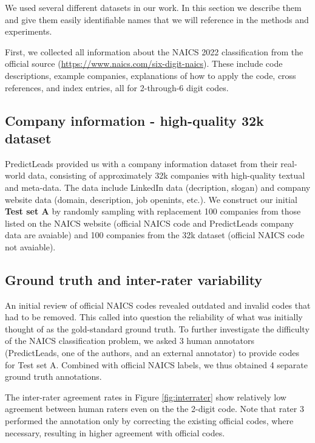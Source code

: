\documentclass[fleqn,moreauthors,10pt]{ds_report}
\begin{document}
We used several different datasets in our work. In this section we describe them and give them easily identifiable names that we will reference in the methods and experiments.

First, we collected all information about the NAICS 2022 classification from the official source (\url{https://www.naics.com/six-digit-naics}). These include code descriptions, example companies, explanations of how to apply the code, cross references, and index entries, all for 2-through-6 digit codes.

\subsection*{Company information - high-quality 32k dataset}

PredictLeads provided us with a company information dataset from their real-world data, consisting of approximately 32k companies with high-quality textual and meta-data. The data include LinkedIn data (decription, slogan) and company website data (domain, description, job openints, etc.). We construct our initial \textbf{Test set A} by randomly sampling with replacement 100 companies from those listed on the NAICS website (official NAICS code and PredictLeads company data are avaiable) and 100 companies from the 32k dataset (official NAICS code not avaiable).

\subsection*{Ground truth and inter-rater variability}

An initial review of official NAICS codes revealed outdated and invalid codes that had to be removed. This called into question the reliability of what was initially thought of as the gold-standard ground truth. To further investigate the difficulty of the NAICS classification problem, we asked 3 human annotators (PredictLeads, one of the authors, and an external annotator) to provide codes for Test set A. Combined with official NAICS labels, we thus obtained 4 separate ground truth annotations.

The inter-rater agreement rates in Figure \ref{fig:interrater} show relatively low agreement between human raters even on the the 2-digit code. Note that rater 3 performed the annotation only by correcting the existing official codes, where necessary, resulting in higher agreement with official codes.
\end{document}
